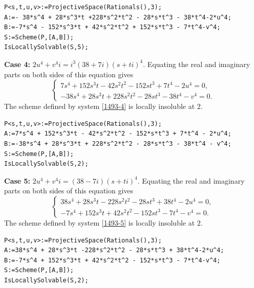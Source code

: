 \documentclass[a4paper,12pt,english,reqno]{amsart}
\begin{document}
\begin{lstlisting}
P<s,t,u,v>:=ProjectiveSpace(Rationals(),3);
A:=- 38*s^4 + 28*s^3*t +228*s^2*t^2 - 28*s*t^3 - 38*t^4-2*u^4;
B:=-7*s^4 - 152*s^3*t + 42*s^2*t^2 + 152*s*t^3 - 7*t^4-v^4;
S:=Scheme(P,[A,B]);
IsLocallySolvable(S,5);
\end{lstlisting}

{\bf Case 4:} $2u^4+v^4i=i^3(38+7i)(s+ti)^4$. Equating the real and imaginary parts on both sides of this equation gives
\begin{equation}\label{1493-4}
\begin{cases}
7s^4 + 152s^3t - 42s^2t^2 - 152st^3 + 7t^4 - 2u^4=0,\\
-38s^4 + 28s^3t + 228s^2t^2 - 28st^3 - 38t^4 - v^4=0.
\end{cases}
\end{equation}
The scheme defined by system \eqref{1493-4} is locally insoluble at $2$.

\begin{lstlisting}
P<s,t,u,v>:=ProjectiveSpace(Rationals(),3);
A:=7*s^4 + 152*s^3*t - 42*s^2*t^2 - 152*s*t^3 + 7*t^4 - 2*u^4;
B:=-38*s^4 + 28*s^3*t + 228*s^2*t^2 - 28*s*t^3 - 38*t^4 - v^4;
S:=Scheme(P,[A,B]);
IsLocallySolvable(S,2);
\end{lstlisting}

{\bf Case 5:} $2u^4+v^4i=(38-7i)(s+ti)^4$. Equating the real and imaginary parts on both sides of this equation gives
\begin{equation}\label{1493-5}
\begin{cases}
38s^4 + 28s^3t - 228s^2t^2 - 28st^3 + 38t^4 - 2u^4=0,\\
-7s^4 + 152s^3t + 42s^2t^2 - 152st^3 - 7t^4 - v^4=0.
\end{cases}
\end{equation}
The scheme defined by system \eqref{1493-5} is locally insoluble at $2$.


\begin{lstlisting}
P<s,t,u,v>:=ProjectiveSpace(Rationals(),3);
A:=38*s^4 + 28*s^3*t -228*s^2*t^2 - 28*s*t^3 + 38*t^4-2*u^4;
B:=-7*s^4 + 152*s^3*t + 42*s^2*t^2 - 152*s*t^3 - 7*t^4-v^4;
S:=Scheme(P,[A,B]);
IsLocallySolvable(S,2);
\end{lstlisting}
\end{document}
